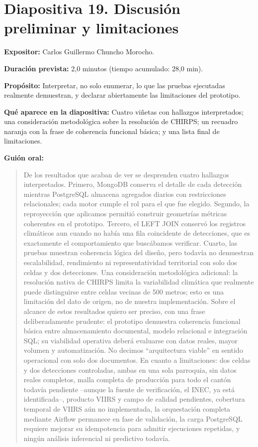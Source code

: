 \documentclass[11pt,a4paper]{article}
\newcommand{\campo}[2]{\par\medskip\noindent\textbf{#1:} #2\par}
\newenvironment{guionoral}{%
  \medskip\noindent\textbf{Gui\'on oral:}\par\smallskip
  \begin{quote}\small
}{%
  \end{quote}
}
\newcommand{\separadordiapositiva}{\bigskip\noindent{\color{Tierra!60}\hrulefill}\bigskip}
\begin{document}
\separadordiapositiva

\section*{Diapositiva 19. Discusi\'on preliminar y limitaciones}

\campo{Expositor}{Carlos Guillermo Chuncho Morocho.}
\campo{Duraci\'on prevista}{2,0 minutos (tiempo acumulado: 28,0 min).}
\campo{Prop\'osito}{Interpretar, no solo enumerar, lo que las pruebas
ejecutadas realmente demuestran, y declarar abiertamente las
limitaciones del prototipo.}
\campo{Qu\'e aparece en la diapositiva}{Cuatro vi\~netas con hallazgos
interpretados; una consideraci\'on metodol\'ogica sobre la
resoluci\'on de CHIRPS; un recuadro naranja con la frase de
coherencia funcional b\'asica; y una lista final de limitaciones.}

\begin{guionoral}
De los resultados que acaban de ver se desprenden cuatro hallazgos
interpretados. Primero, MongoDB conserva el detalle de cada detecci\'on
mientras PostgreSQL almacena agregados diarios con restricciones
relacionales; cada motor cumple el rol para el que fue elegido.
Segundo, la reproyecci\'on que aplicamos permiti\'o construir
geometr\'ias m\'etricas coherentes en el prototipo. Tercero, el LEFT
JOIN conserv\'o los registros clim\'aticos aun cuando no hab\'ia una
fila coincidente de detecciones, que es exactamente el comportamiento
que busc\'abamos verificar. Cuarto, las pruebas muestran coherencia
l\'ogica del dise\~no, pero todav\'ia no demuestran escalabilidad,
rendimiento ni representatividad territorial con solo dos celdas y dos
detecciones. Una consideraci\'on metodol\'ogica adicional: la
resoluci\'on nativa de CHIRPS limita la variabilidad clim\'atica que
realmente puede distinguirse entre celdas vecinas de 500 metros; esto
es una limitaci\'on del dato de origen, no de nuestra implementaci\'on.
Sobre el alcance de estos resultados quiero ser preciso, con una frase
deliberadamente prudente: el prototipo demuestra coherencia funcional
b\'asica entre almacenamiento documental, modelo relacional e
integraci\'on SQL; su viabilidad operativa deber\'a evaluarse con
datos reales, mayor volumen y automatizaci\'on. No decimos
``arquitectura viable'' en sentido operacional con solo dos documentos.
En cuanto a limitaciones: dos celdas y dos detecciones controladas,
ambas en una sola parroquia, sin datos reales completos, malla
completa de producci\'on para todo el cant\'on todav\'ia pendiente
--aunque la fuente de verificaci\'on, el INEC, ya est\'a identificada--,
producto VIIRS y campo de calidad pendientes, cobertura temporal de
VIIRS a\'un no implementada, la orquestaci\'on completa mediante
Airflow permanece en fase de validaci\'on, la carga PostgreSQL
requiere mejorar su idempotencia para admitir ejecuciones repetidas, y
ning\'un an\'alisis inferencial ni predictivo todav\'ia.
\end{guionoral}
\end{document}
